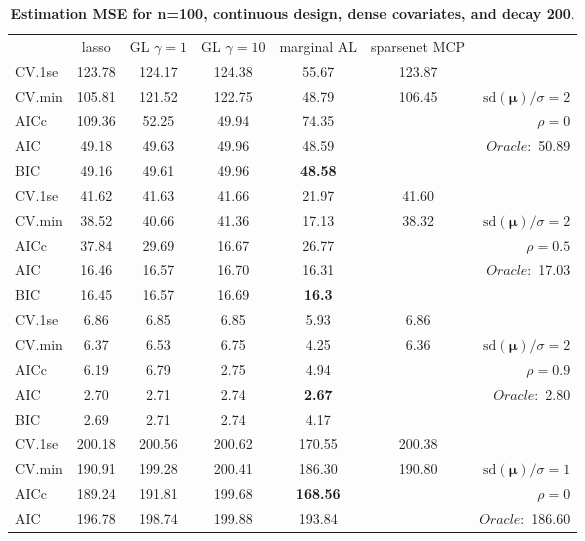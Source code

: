 \clearpage
\begin{table}\vspace{-.5cm}
\caption[l]{ { \bf Estimation MSE for n=100, continuous design, 
dense covariates, and  decay  200}.}
\vspace{-.5cm}
\footnotesize{}
\begin{center}
\begin{tabular}{l*{5}{c}|r}
& lasso & GL $\gamma=1$ & GL $\gamma=10$ & marginal AL & sparsenet MCP  & \\
 \cline{1-7}
CV.1se & 123.78 & 124.17 & 124.38 & 55.67 & 123.87 & \\
CV.min & 105.81 & 121.52 & 122.75 & 48.79 & 106.45 &  $\mathrm{sd}(\mathbf{\mu})/\sigma=2$ \\
AICc & 109.36 & 52.25 & 49.94 & 74.35 & & $\rho=0$ \\
AIC & 49.18 & 49.63 & 49.96 & 48.59 & &  \multirow{2}{*}{$Oracle: $ 50.89} \\
BIC & 49.16 & 49.61 & 49.96 & {\bf 48.58} & &  \\
 \hline 
CV.1se & 41.62 & 41.63 & 41.66 & 21.97 & 41.60 & \\
CV.min & 38.52 & 40.66 & 41.36 & 17.13 & 38.32 &  $\mathrm{sd}(\mathbf{\mu})/\sigma=2$ \\
AICc & 37.84 & 29.69 & 16.67 & 26.77 & & $\rho=0.5$ \\
AIC & 16.46 & 16.57 & 16.70 & 16.31 & &  \multirow{2}{*}{$Oracle: $ 17.03} \\
BIC & 16.45 & 16.57 & 16.69 & {\bf 16.3} & &  \\
 \hline 
CV.1se & 6.86 & 6.85 & 6.85 & 5.93 & 6.86 & \\
CV.min & 6.37 & 6.53 & 6.75 & 4.25 & 6.36 &  $\mathrm{sd}(\mathbf{\mu})/\sigma=2$ \\
AICc & 6.19 & 6.79 & 2.75 & 4.94 & & $\rho=0.9$ \\
AIC & 2.70 & 2.71 & 2.74 & {\bf 2.67} & &  \multirow{2}{*}{$Oracle: $ 2.80} \\
BIC & 2.69 & 2.71 & 2.74 & 4.17 & &  \\
 \hline 
CV.1se & 200.18 & 200.56 & 200.62 & 170.55 & 200.38 & \\
CV.min & 190.91 & 199.28 & 200.41 & 186.30 & 190.80 &  $\mathrm{sd}(\mathbf{\mu})/\sigma=1$ \\
AICc & 189.24 & 191.81 & 199.68 & {\bf 168.56} & & $\rho=0$ \\
AIC & 196.78 & 198.74 & 199.88 & 193.84 & &  \multirow{2}{*}{$Oracle: $ 186.60} \\

\end{tabular}
\end{center}
\end{table}
